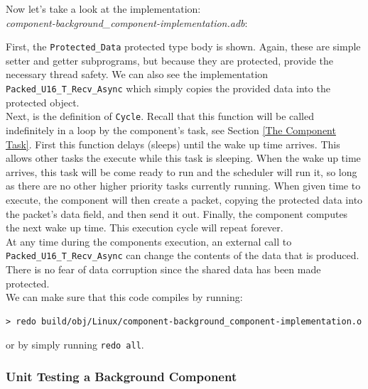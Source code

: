 Now let's take a look at the implementation: \\

\textit{component-background\_component-implementation.adb}:

First, the \texttt{Protected\_Data} protected type body is shown. Again, these are simple setter and getter subprograms, but because they are protected, provide the necessary thread safety. We can also see the implementation \texttt{Packed\_U16\_T\_Recv\_Async} which simply copies the provided data into the protected object. \\

Next, is the definition of \texttt{Cycle}. Recall that this function will be called indefinitely in a loop by the component's task, see Section \ref{The Component Task}. First this function delays (sleeps) until the wake up time arrives. This allows other tasks the execute while this task is sleeping. When the wake up time arrives, this task will be come ready to run and the scheduler will run it, so long as there are no other higher priority tasks currently running. When given time to execute, the component will then create a packet, copying the protected data into the packet's data field, and then send it out. Finally, the component computes the next wake up time. This execution cycle will repeat forever. \\

At any time during the components execution, an external call to \texttt{Packed\_U16\_T\_Recv\_Async} can change the contents of the data that is produced. There is no fear of data corruption since the shared data has been made protected. \\

We can make sure that this code compiles by running:

\vspace{5mm} %
\begin{verbatim}
> redo build/obj/Linux/component-background_component-implementation.o
\end{verbatim}
\vspace{5mm} %

or by simply running \texttt{redo all}. \\

\subsubsection{Unit Testing a Background Component}

